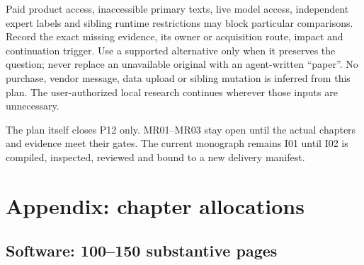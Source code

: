 \documentclass[
  11pt,
  a4paper,
]{article}
\begin{document}
Paid product access, inaccessible primary texts, live model access,
independent expert labels and sibling runtime restrictions may block
particular comparisons. Record the exact missing evidence, its owner or
acquisition route, impact and continuation trigger. Use a supported
alternative only when it preserves the question; never replace an
unavailable original with an agent-written ``paper''. No purchase,
vendor message, data upload or sibling mutation is inferred from this
plan. The user-authorized local research continues wherever those inputs
are unnecessary.

The plan itself closes P12 only. MR01--MR03 stay open until the actual
chapters and evidence meet their gates. The current monograph remains
I01 until I02 is compiled, inspected, reviewed and bound to a new
delivery manifest.

\newpage

\hypertarget{appendix-chapter-allocations}{%
\section{Appendix: chapter
allocations}\label{appendix-chapter-allocations}}

\hypertarget{software-100150-substantive-pages}{%
\subsection{Software: 100--150 substantive
pages}\label{software-100150-substantive-pages}}
\end{document}
